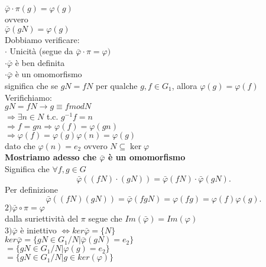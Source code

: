 \documentclass[12px]{article}
\begin{document}
{\begin{dimo}
		$\bar \varphi\cdot \pi(g) = \varphi(g)$\\
		ovvero\\
		$ \bar \varphi(gN) = \varphi(g)$\\
		Dobbiamo verificare:\\
		$\cdot $ Unicità (segue da $\bar \varphi\cdot \pi = \varphi)$\\
		$\cdot \bar \varphi$  è ben definita\\
		$\cdot \bar \varphi$ è un omomorfismo\\
		significa che se $gN=fN$ per qualche $g,f\in G_1$, allora $ \varphi(g) = \varphi(f)$\\
		Verifichiamo:\\
		$gN = fN \rightarrow g\equiv f mod N$\\
		$ \Rightarrow \exists n\in N$ t.c. $g^{-1}f = n$\\
		 $ \Rightarrow f=gn \Rightarrow \varphi(f) = \varphi(gn)$ \\
		 $ \Rightarrow \varphi(f) = \varphi(g) \varphi(n) = \varphi(g)$ \\
		 dato che $ \varphi(n) = e_2$ ovvero $N\subseteq\ker \varphi$\\
		 \textbf{Mostriamo adesso che $\bar \varphi$ è un omomorfismo}\\
		 Significa che $\forall f,g\in G$\\
		  \[
		 \bar \varphi((fN)\cdot (gN)) = \bar \varphi(fN)\cdot \bar\varphi(gN)
		 .\] 
		 Per definizione\\
		 \[
		 \bar\varphi ((fN)(gN)) = \bar \varphi(fgN) = \varphi(fg) = \varphi(f) \varphi(g)
		 .\] 
		 $2) \bar \varphi\circ \pi = \varphi$\\
		 dalla suriettività del $\pi$ segue che  $Im(\bar  \varphi) = Im ( \varphi)$\\
		 $3) \bar \varphi$ è iniettivo $ \Leftrightarrow ker \bar \varphi = \lbrace N\rbrace$\\
		 $ker\bar \varphi = \lbrace gN\in G_1/N | \bar \varphi(gN) = e_2\rbrace$\\
		 $=\lbrace gN\in G_1/N | \varphi(g) = e_2\rbrace$\\
		 $=\lbrace gN\in G_1/N | g\in ker( \varphi)\rbrace$
	  \end{dimo}
	  }
\end{document}
